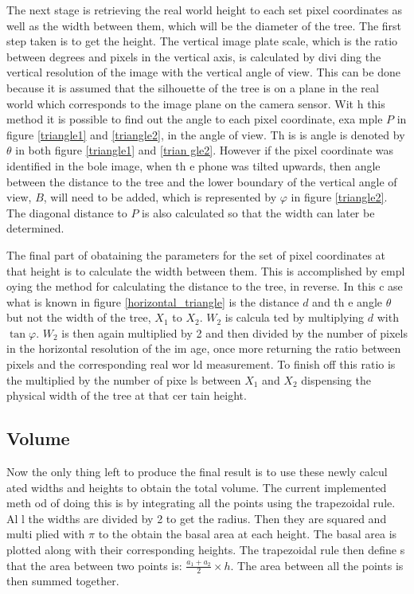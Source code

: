 The next stage is retrieving the real world height to each set pixel coordinates
 as well as the width between them, which will be the diameter of the tree. The 
first step taken is to get the height. The vertical image plate scale, which is 
the ratio between degrees and pixels in the vertical axis, is calculated by divi
ding the vertical resolution of the image with the vertical angle of view. This 
can be done because it is assumed that the silhouette of the tree is on a plane 
in the real world which corresponds to the image plane on the camera sensor. Wit
h this method it is possible to find out the angle to each pixel coordinate, exa
mple $P$ in figure \ref{triangle1} and \ref{triangle2}, in the angle of view. Th
is is angle is denoted by $\theta$ in both figure \ref{triangle1} and \ref{trian
gle2}. However if the pixel coordinate was identified in the bole image, when th
e phone was tilted upwards, then angle between the distance to the tree and the 
lower boundary of the vertical angle of view, $B$, will need to be added, which 
is represented by $\varphi$ in figure \ref{triangle2}. The diagonal distance to 
$P$ is also calculated so that the width can later be determined.

The final part of obataining the parameters for the set of pixel coordinates at 
that height is to calculate the width between them. This is accomplished by empl
oying the method for calculating the distance to the tree, in reverse. In this c
ase what is known in figure \ref{horizontal_triangle} is the distance $d$ and th
e angle $\theta$ but not the width of the tree, $X_1$ to $X_2$. $W_2$ is calcula
ted by multiplying $d$ with $\tan{\varphi}$. $W_2$ is then again multiplied by 2
 and then divided by the number of pixels in the horizontal resolution of the im
age, once more returning the ratio between pixels and the corresponding real wor
ld measurement. To finish off this ratio is the multiplied by the number of pixe
ls between $X_1$ and $X_2$ dispensing the physical width of the tree at that cer
tain height.


\subsection{Volume}
Now the only thing left to produce the final result is to use these newly calcul
ated widths and heights to obtain the total volume. The current implemented meth
od of doing this is by integrating all the points using the trapezoidal rule. Al
l the widths are divided by 2 to get the radius. Then they are squared and multi
plied with $\pi$ to the obtain the basal area at each height. The basal area is 
plotted along with their corresponding heights. The trapezoidal rule then define
s that the area between two points is: $\frac{a_1 + a_2}{2} \times h$. The area 
between all the points is then summed together.


